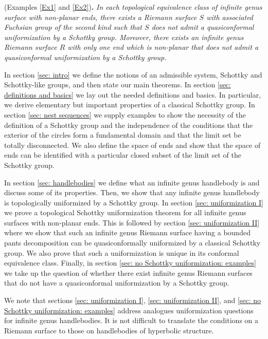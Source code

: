 \documentclass[12pt]{amsart}
\theoremstyle{plain}
\begin{document}
\vskip10pt 
 (Examples \ref{Ex1} and \ref{Ex2}){\bf.}
{\it In each topological equivalence class of infinite genus  surface with non-planar ends, 
there exists a Riemann surface $S$ with associated Fuchsian group of the second kind such that  $S$ 
does not admit a quasiconformal uniformization by a Schottky group.
Moreover, there exists an infinite genus Riemann surface $R$ with only one end which is non-planar
that does not admit a quasiconformal uniformization by a Schottky group.}




\vskip10pt
  In section \ref{sec: intro} we define the notions of an admissible system, Schottky and Schottky-like groups, and then state our main theorems. In section \ref{sec: definitions and basics} we lay out the needed definitions and basics.  In particular, we derive elementary but important properties of  a classical Schottky group.  In section \ref{sec: nest sequences} we supply examples to show the necessity of the definition of a Schottky group and the independence of the conditions that the exterior of the circles form a fundamental domain and that the limit set be totally disconnected.  We also define the space of ends and show that the space of ends can be identified with a particular closed subset of the limit set of the Schottky group. 

In section \ref{sec: handlebodies} we define what an  infinite genus handlebody is and discuss some of its properties. 
Then, we show that any infinite genus handlebody is topologically uniformized by a Schottky group.
In section \ref{sec: uniformization I} we prove a  topological Schottky uniformization theorem for all infinite genus surfaces with non-planar ends.  This is followed by  section \ref{sec: uniformization II} where we show that such an infinite genus Riemann surface having a bounded pants decomposition can be quasiconformally uniformized by a classical Schottky group. 
We also prove that such a uniformization is unique in its conformal equivalence  class.
Finally, in section \ref{sec: no Schottky uniformization: examples} we take up the question of whether there exist infinite genus Riemann surfaces that do not have a quasiconformal uniformization by a Schottky group. 

We note that sections \ref{sec: uniformization I}, \ref{sec: uniformization II}, and 
\ref{sec: no Schottky uniformization: examples} address analogues uniformization questions for infinite genus handlebodies.
It is not difficult to translate the conditions on a Riemann surface to
those on handlebodies of hyperbolic structure.
\vskip5pt
\end{document}
